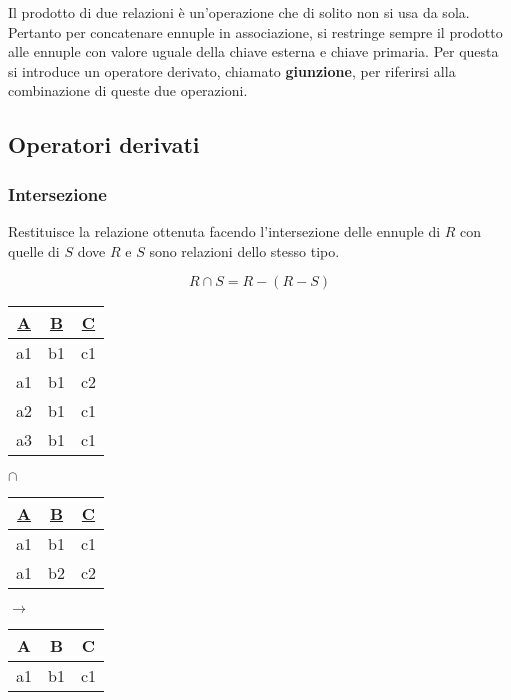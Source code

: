 \begin{observation}
	Il prodotto di due relazioni è un’operazione che di solito non si usa da sola. Pertanto per concatenare ennuple in associazione, si restringe sempre il prodotto alle ennuple con valore uguale della chiave esterna e chiave primaria. Per questa si introduce un operatore derivato, chiamato \textbf{giunzione}, per riferirsi alla combinazione di queste due operazioni.
\end{observation}

\subsection{Operatori derivati}
\subsubsection{Intersezione}
Restituisce la relazione ottenuta facendo l’intersezione delle ennuple di $R$ con quelle di $S$ dove $R$ e $S$ sono relazioni dello stesso tipo.

\begin{equation}
	R \cap S = R - (R-S)
\end{equation}

\begin{table}[!h]
	\centering
	\begin{tabular}{|c|c|c|}
		\hline
		\textbf{\underline{A}} & \textbf{\underline{B}} & \textbf{\underline{C}} \\
		\hline
		a1 & b1 & c1 \\
		\hline
		a1 & b1 & c2 \\
		\hline
		a2 & b1 & c1 \\
		\hline
		a3 & b1 & c1 \\
		\hline
	\end{tabular}
	\hspace{10pt} $\cap$ \hspace{10pt}
	\begin{tabular}{|c|c|c|}
		\hline
		\textbf{\underline{A}} & \textbf{\underline{B}} & \textbf{\underline{C}} \\
		\hline
		a1 & b1 & c1 \\
		\hline
		a1 & b2 & c2 \\
		\hline
	\end{tabular}
	\hspace{10pt} $\longrightarrow$ \hspace{10pt}
	\begin{tabular}{|c|c|c|}
		\hline
		\textbf{A} & \textbf{B} & \textbf{C} \\
		\hline
		a1 & b1 & c1 \\
		\hline
	\end{tabular}
\end{table}

